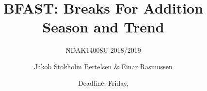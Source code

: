 \usepackage[english, ku, titlepage]{ku-frontpage}
\title{BFAST: Breaks For Addition Season and Trend} %
\subtitle{NDAK14008U 2018/2019} %
\author{
Jakob Stokholm Bertelsen %
\&
Einar Rasmussen %
}
\date{Deadline: Friday, }
